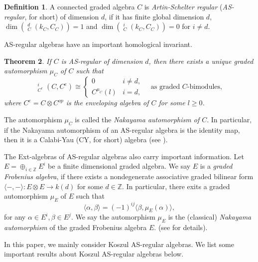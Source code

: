 \documentclass[a4paper,10pt]{amsart}
\newtheorem{theorem}{Theorem}[section]
\theoremstyle{definition}
\newtheorem{definition}[theorem]{Definition}
\numberwithin{equation}{section}
\DeclareMathOperator{\uExt}{\underline{Ext}}
\begin{document}
\begin{definition}
A connected graded algebra $C$ is \emph{Artin-Schelter regular}  (\emph{AS-regular}, for short) of dimension $d$, if it  has finite global dimension $d$, $\dim\left(\uExt_{C}^{d}(k_C, C_C)\right)=1$ and $\dim\left(\uExt_{C}^{i}(k_C, C_C)\right)=0$ for $i\neq d$.
\end{definition}
AS-regular algebras have an important homological invariant.

\begin{theorem} \cite[Proposition 4.5 (b)]{YZ}\label{thm: Nakayama aut of AS regular algebras} If $C$ is AS-regular of dimension $d$, then there exists a unique graded automorphism $\mu_C$ of $C$ such that
$$\uExt^i_{C^e}(C,C^e)\cong\left\{\begin{array}{ll} 0&i\neq d,\\C^{\mu_C}(l)&i=d,   \end{array}\right. \quad \text{as graded $C$-bimodules},$$
where $C^e=C\otimes C^{op}$ is the enveloping algebra of $C$ for some $l\geq 0$.
\end{theorem}
The automorphism $\mu_C$ is called the \emph{Nakayama automorphism of $C$}. In particular, if the Nakayama automorphism of an AS-regular algebra is the identity map, then it is a Calabi-Yau (CY, for short) algebra (see \cite{Gin,RRZ1}).

The Ext-algebras of AS-regular algebras also carry important information. Let $E=\oplus_{i\in \mathbb{Z}}E^i$ be a finite dimensional graded algebra. We say $E$ is a \emph{graded Frobenius algebra}, if there exists a nondegenerate associative graded bilinear form $\langle -,-\rangle: E\otimes E\to k(d)$ for some $d\in \mathbb{Z}$. In particular, there exits a graded automorphism $\mu_E$ of $E$ such that
$$
\langle \alpha,\beta\rangle=(-1)^{ij}\langle \beta,\mu_E(\alpha)\rangle,
$$
for any $\alpha\in E^i,\beta\in E^j$. We say the automorphism $\mu_E$ is the (classical) \emph{Nakayama automorphism} of the graded Frobenius algebra $E$. (see \cite{Sm} for details).


In this paper, we mainly consider Koszul AS-regular algebras. We list some important results about Koszul AS-regular algebras below.
\end{document}
